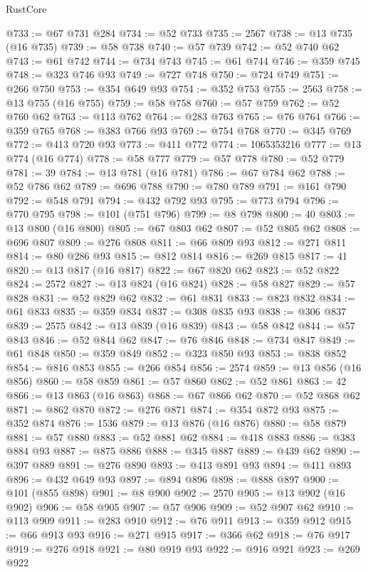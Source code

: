 \begin{lexlean}{RustCore}
\begin{coremodule}
@733 := @67 @731 @284
@734 := @52 @733
@735 := 2567
@738 := @13 @735 (@16 @735)
@739 := @58 @738
@740 := @57 @739
@742 := @52 @740 @62
@743 := @61 @742
@744 := @734 @743
@745 := @61 @744
@746 := @359 @745
@748 := @323 @746 @93
@749 := @727 @748
@750 := @724 @749
@751 := @266 @750
@753 := @354 @649 @93
@754 := @352 @753
@755 := 2563
@758 := @13 @755 (@16 @755)
@759 := @58 @758
@760 := @57 @759
@762 := @52 @760 @62
@763 := @113 @762
@764 := @283 @763
@765 := @76 @764
@766 := @359 @765
@768 := @383 @766 @93
@769 := @754 @768
@770 := @345 @769
@772 := @413 @720 @93
@773 := @411 @772
@774 := 1065353216
@777 := @13 @774 (@16 @774)
@778 := @58 @777
@779 := @57 @778
@780 := @52 @779
@781 := 39
@784 := @13 @781 (@16 @781)
@786 := @67 @784 @62
@788 := @52 @786 @62
@789 := @696 @788
@790 := @780 @789
@791 := @161 @790
@792 := @548 @791
@794 := @432 @792 @93
@795 := @773 @794
@796 := @770 @795
@798 := @101 (@751 @796)
@799 := @8 @798
@800 := 40
@803 := @13 @800 (@16 @800)
@805 := @67 @803 @62
@807 := @52 @805 @62
@808 := @696 @807
@809 := @276 @808
@811 := @66 @809 @93
@812 := @271 @811
@814 := @80 @286 @93
@815 := @812 @814
@816 := @269 @815
@817 := 41
@820 := @13 @817 (@16 @817)
@822 := @67 @820 @62
@823 := @52 @822
@824 := 2572
@827 := @13 @824 (@16 @824)
@828 := @58 @827
@829 := @57 @828
@831 := @52 @829 @62
@832 := @61 @831
@833 := @823 @832
@834 := @61 @833
@835 := @359 @834
@837 := @308 @835 @93
@838 := @306 @837
@839 := 2575
@842 := @13 @839 (@16 @839)
@843 := @58 @842
@844 := @57 @843
@846 := @52 @844 @62
@847 := @76 @846
@848 := @734 @847
@849 := @61 @848
@850 := @359 @849
@852 := @323 @850 @93
@853 := @838 @852
@854 := @816 @853
@855 := @266 @854
@856 := 2574
@859 := @13 @856 (@16 @856)
@860 := @58 @859
@861 := @57 @860
@862 := @52 @861
@863 := 42
@866 := @13 @863 (@16 @863)
@868 := @67 @866 @62
@870 := @52 @868 @62
@871 := @862 @870
@872 := @276 @871
@874 := @354 @872 @93
@875 := @352 @874
@876 := 1536
@879 := @13 @876 (@16 @876)
@880 := @58 @879
@881 := @57 @880
@883 := @52 @881 @62
@884 := @418 @883
@886 := @383 @884 @93
@887 := @875 @886
@888 := @345 @887
@889 := @439 @62
@890 := @397 @889
@891 := @276 @890
@893 := @413 @891 @93
@894 := @411 @893
@896 := @432 @649 @93
@897 := @894 @896
@898 := @888 @897
@900 := @101 (@855 @898)
@901 := @8 @900
@902 := 2570
@905 := @13 @902 (@16 @902)
@906 := @58 @905
@907 := @57 @906
@909 := @52 @907 @62
@910 := @113 @909
@911 := @283 @910
@912 := @76 @911
@913 := @359 @912
@915 := @66 @913 @93
@916 := @271 @915
@917 := @366 @62
@918 := @76 @917
@919 := @276 @918
@921 := @80 @919 @93
@922 := @916 @921
@923 := @269 @922

\end{coremodule}
\end{lexlean}
